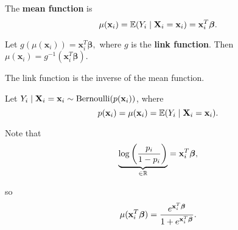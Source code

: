 \begin{definition}
	The \textbf{mean function} is \[
	\mu(\mathbf x_i)=\mathbb E(Y_i\mid \mathbf X_i=\mathbf x_i)=\mathbf x_i^T\boldsymbol \beta
	.\] 			
\end{definition}

\begin{definition}
	Let $g(\mu(\mathbf x_i))=\mathbf x_i^T\boldsymbol\beta,$ where $g$ is the \textbf{link function}. Then
	$\mu(\mathbf x_i)=g^{-1}(\mathbf x_{i}^T\boldsymbol \beta).$
\end{definition}

\begin{note}
	The link function is the inverse of the mean function.
\end{note}

\begin{eg}	
	Let $Y_i\mid \mathbf X_i=\mathbf x_i\sim \operatorname*{Bernoulli}(p(\mathbf x_i))$, where  \[
	p(\mathbf x_i)=\mu(\mathbf x_i)=\mathbb E(Y_i\mid \mathbf X_i=\mathbf x_i)
	.\] 
\end{eg}

Note that \[
		\underbrace{\log\left( \frac{p_i}{1-p_i}\right)}_{\in \mathbb R}=\mathbf x_i^T\boldsymbol \beta,
\] 

so $$\mu(\mathbf x_i^T{\boldsymbol{\beta}})=\frac{e^{\mathbf x_i^T{\boldsymbol{\beta}}}}{1+e^{\mathbf x_i^T{\boldsymbol{\beta}}}}.$$
